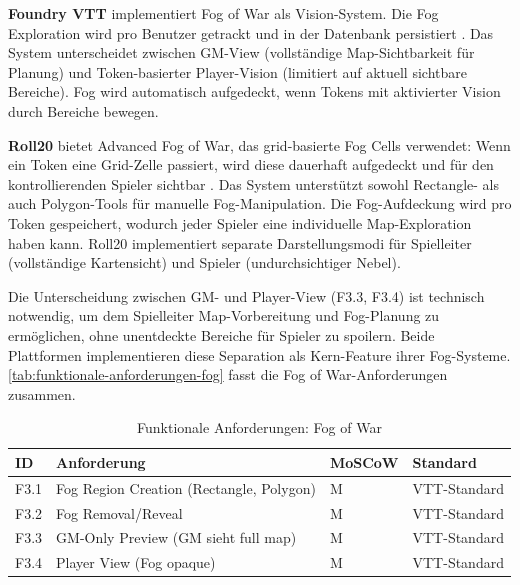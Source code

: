 \textbf{Foundry \ac{VTT}} implementiert Fog of War als Vision-System. Die Fog Exploration wird pro Benutzer getrackt und in der Datenbank persistiert \autocite{FoundryScenes2024}. Das System unterscheidet zwischen GM-View (vollständige Map-Sichtbarkeit für Planung) und Token-basierter Player-Vision (limitiert auf aktuell sichtbare Bereiche). Fog wird automatisch aufgedeckt, wenn Tokens mit aktivierter Vision durch Bereiche bewegen.

\textbf{Roll20} bietet Advanced Fog of War, das grid-basierte Fog Cells verwendet: Wenn ein Token eine Grid-Zelle passiert, wird diese dauerhaft aufgedeckt und für den kontrollierenden Spieler sichtbar \autocite{Roll20FogOfWar2024}. Das System unterstützt sowohl Rectangle- als auch Polygon-Tools für manuelle Fog-Manipulation. Die Fog-Aufdeckung wird pro Token gespeichert, wodurch jeder Spieler eine individuelle Map-Exploration haben kann. Roll20 implementiert separate Darstellungsmodi für Spielleiter (vollständige Kartensicht) und Spieler (undurchsichtiger Nebel).

Die Unterscheidung zwischen \ac{GM}- und Player-View (F3.3, F3.4) ist technisch notwendig, um dem Spielleiter Map-Vorbereitung und Fog-Planung zu ermöglichen, ohne unentdeckte Bereiche für Spieler zu spoilern. Beide Plattformen implementieren diese Separation als Kern-Feature ihrer Fog-Systeme. \autoref{tab:funktionale-anforderungen-fog} fasst die Fog of War-Anforderungen zusammen.

\begin{table}[htbp]
	\centering
	\small
	\caption{Funktionale Anforderungen: Fog of War}
	\label{tab:funktionale-anforderungen-fog}
	\begin{tabularx}{\textwidth}{llXl}
		\toprule
		\textbf{ID} & \textbf{Anforderung}                          & \textbf{MoSCoW} & \textbf{Standard} \\
		\midrule
		F3.1        & Fog Region Creation (Rectangle, Polygon)      & M               & \ac{VTT}-Standard \\
		F3.2        & Fog Removal/Reveal                            & M               & \ac{VTT}-Standard \\
		F3.3        & \ac{GM}-Only Preview (\ac{GM} sieht full map) & M               & \ac{VTT}-Standard \\
		F3.4        & Player View (Fog opaque)                      & M               & \ac{VTT}-Standard \\
		\bottomrule
	\end{tabularx}
\end{table}

